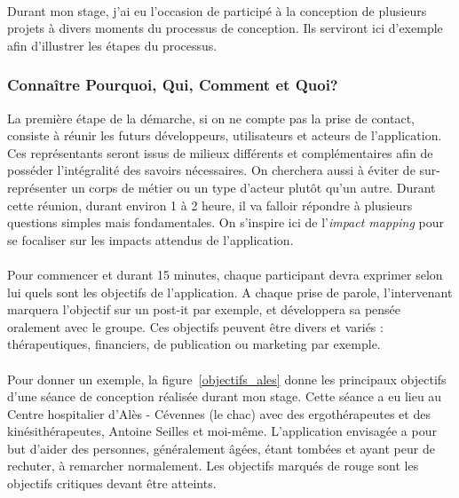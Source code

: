 \paragraph{} Durant mon stage, j'ai eu l'occasion de participé à la conception de plusieurs projets à divers moments du processus de conception. Ils serviront ici d'exemple afin d'illustrer les étapes du processus.

	\subsubsection*{Connaître Pourquoi, Qui, Comment et Quoi?}
La première étape de la démarche, si on ne compte pas la prise de contact, consiste à réunir les futurs développeurs, utilisateurs et acteurs de l'application. Ces représentants seront issus de milieux différents et complémentaires afin de posséder l'intégralité des savoirs nécessaires. On cherchera aussi à éviter de sur-représenter un corps de métier ou un type d'acteur plutôt qu'un autre. Durant cette réunion, durant environ 1 à 2 heure, il va falloir répondre à plusieurs questions simples mais fondamentales. On s'inspire ici de l'\emph{impact mapping} pour se focaliser sur les impacts attendus de l'application.

\paragraph{}Pour commencer et durant 15 minutes, chaque participant devra exprimer selon lui quels sont les objectifs de l'application. A chaque prise de parole, l'intervenant marquera l'objectif sur un post-it par exemple, et développera sa pensée oralement avec le groupe. Ces objectifs peuvent être divers et variés : thérapeutiques, financiers, de publication ou marketing par exemple. 

\paragraph{} Pour donner un exemple, la figure~\ref{objectifs_ales} donne les principaux objectifs d'une séance de conception réalisée durant mon stage. Cette séance a eu lieu au Centre hospitalier d'Alès - Cévennes (le \gls{chac}) avec des ergothérapeutes et des kinésithérapeutes, Antoine Seilles et moi-même. L'application envisagée a pour but d'aider des personnes, généralement âgées, étant tombées et ayant peur de rechuter, à remarcher normalement. Les objectifs marqués de rouge sont les objectifs critiques devant être atteints.


